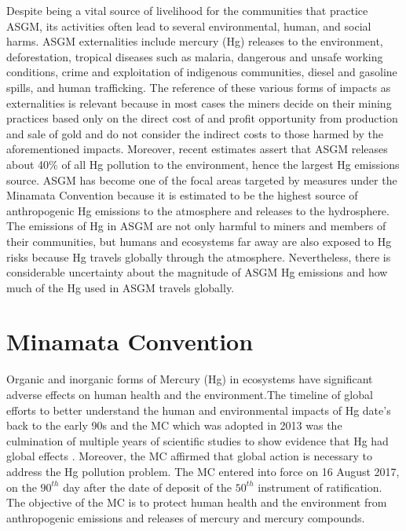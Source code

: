 Despite being a vital source of livelihood for the communities that practice ASGM, its activities often lead to several environmental, human, and social harms. ASGM externalities include mercury (Hg) releases to the environment, deforestation, tropical diseases such as malaria, dangerous and unsafe working conditions, crime and exploitation of indigenous communities, diesel and gasoline spills, and human trafficking. The reference of these various forms of impacts as externalities is relevant because in most cases the miners decide on their mining practices based only on the direct cost of and profit opportunity from production and sale of gold and do not consider the indirect costs to those harmed by the aforementioned impacts. Moreover, recent estimates assert that ASGM releases about 40\% of all Hg pollution to the environment, hence the largest Hg emissions source\cite{united_nations_environment_programme_technical_2019}. ASGM has become one of the focal areas targeted by measures under the Minamata Convention because it is estimated to be the highest source of anthropogenic Hg emissions to the atmosphere and releases to the hydrosphere. The emissions of Hg in ASGM are not only harmful to miners and members of their communities, but humans and ecosystems far away are also exposed to Hg risks because Hg travels globally through the atmosphere. Nevertheless, there is considerable uncertainty about the magnitude of ASGM Hg emissions and how much of the Hg used in ASGM travels globally.

\section{Minamata Convention}
Organic and inorganic forms of Mercury (Hg) in ecosystems have significant adverse effects on human health and the environment.The timeline of global efforts to better understand the human and environmental impacts of Hg date's back to the early 90s and the MC which was adopted in 2013 was the culmination of multiple years of scientific studies to show evidence that Hg had global effects \cite{unep_minamata_2019}. Moreover, the MC affirmed that global action is necessary to address the Hg pollution problem. The MC entered into force on 16 August 2017, on the $90^{th}$ day after the date of deposit of the $50^{th}$  instrument of ratification. The objective of the  MC is to protect human health and the environment from anthropogenic emissions and releases of mercury and mercury compounds\cite{united_nations_environment_programme_technical_2019}. 

